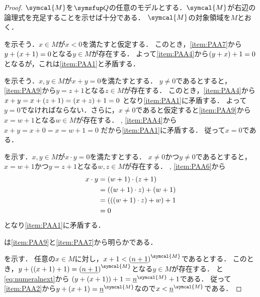 \begin{proof}
	\(\symcal{M}\)を\(\Robinson\)の任意のモデルとする．\(\symcal{M}\)が右辺の論理式を充足することを示せば十分である．
	\(\symcal{M}\)の対象領域を\(M\)とおく．

	を示そう．\(x \in M\)が\(x < 0\)を満たすと仮定する．
	このとき，\cref{item:PAA7}から\(y + \paren{x + 1} = 0\)となる\(y \in M\)が存在する．
	よって\cref{item:PAA4}から\(\paren{y + x} + 1 = 0\)となるが，これは\cref{item:PAA1}と矛盾する．

	を示そう．\(x, y \in M\)が\(x + y = 0\)を満たすとする．
	\(y \neq 0\)であるとすると，\cref{item:PAA9}から\(y = z + 1\)となる\(z \in M\)が存在する．
	このとき，\cref{item:PAA4}から
	\(x + y = x + \paren{z + 1} = \paren{x + z} + 1 = 0\)
	となり\cref{item:PAA1}に矛盾する．
	よって\(y = 0\)でなければならない．さらに，\(x \neq 0\)であると仮定すると\cref{item:PAA9}から\(x = w + 1\)となる\(w \in M\)が存在する．
	, \cref{item:PAA4}から
	\(x + y = x + 0 = x = w + 1 = 0\)
	だから\cref{item:PAA1}に矛盾する．
	従って\(x = 0\)である．

	を示す．\(x, y \in M\)が\(x \cdot y = 0\)を満たすとする．
	\(x \neq 0\)かつ\(y \neq 0\)であるとすると，\(x = w + 1\)かつ\(y = z + 1\)となる\(w, z \in M\)が存在する．
	, \cref{item:PAA6}から
	\begin{align*}
		x \cdot y & = \paren{w + 1} \cdot \paren{z + 1}             \\
		          & = \paren{\paren{w + 1} \cdot z} + \paren{w + 1} \\
		          & = \paren{\paren{\paren{w + 1} \cdot z} + w} + 1 \\
		          & = 0
	\end{align*}
	となり\cref{item:PAA1}に矛盾する．

	は\cref{item:PAA9}と\cref{item:PAA7}から明らかである．

	を示す．
	任意の\(x \in M\)に対し，\(x + 1 < \interpretation{\symcal{M}}{\paren{\numeral{n + 1}}}\)であるとする．
	このとき，\(y + \paren{\paren{x + 1} + 1} = \interpretation{\symcal{M}}{\paren{\numeral{n + 1}}}\)となる\(y \in M\)が存在する．
	と\cref{eq:numeralnext}から
	\(\paren{y + \paren{x + 1}} + 1 = \interpretation{\symcal{M}}{\numeral{n}} + 1\)である．
	従って\cref{item:PAA2}から\(y + \paren{x + 1} = \interpretation{\symcal{M}}{\numeral{n}}\)なので\(x < \interpretation{\symcal{M}}{\numeral{n}}\)である．


\end{proof}
